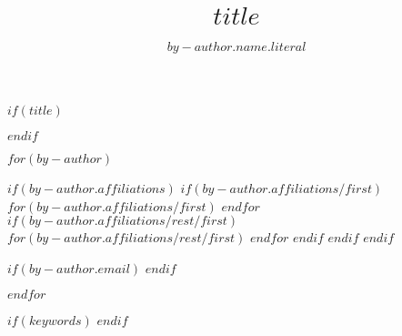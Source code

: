 $if(title)$
\title{$title$}
$endif$

$for(by-author)$
\author{$by-author.name.literal$}
$if(by-author.affiliations)$
$if(by-author.affiliations/first)$
$for(by-author.affiliations/first)$
$endfor$
$if(by-author.affiliations/rest/first)$
$for(by-author.affiliations/rest/first)$
$endfor$
$endif$
$endif$
$endif$

$if(by-author.email)$
$endif$

$endfor$

$if(keywords)$
$endif$